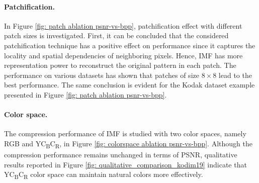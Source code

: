 \paragraph{Patchification.} 
In Figure \ref{fig: patch ablation psnr-vs-bpp}, patchification effect with different patch sizes is investigated.
First, it can be concluded that the considered patchification technique has a positive effect on performance since it captures the locality and spatial dependencies of neighboring pixels. Hence, IMF has more representation power to reconstruct the original pattern in each patch.
The performance on various datasets has shown that patches of size $8\times 8$ lead to the best performance. The same conclusion is evident for the Kodak dataset example presented in Figure \ref{fig: patch ablation psnr-vs-bpp}.

\paragraph{Color space.}
The compression performance of IMF is studied with two color spaces, namely RGB and YC\textsubscript{B}C\textsubscript{R}, in Figure \ref{fig: colorspace ablation psnr-vs-bpp}.
Although the compression performance remains unchanged in terms of PSNR, qualitative results reported in Figure \ref{fig: qualitative_comparison_kodim19} indicate that YC\textsubscript{B}C\textsubscript{R} color space can maintain natural colors more effectively.

